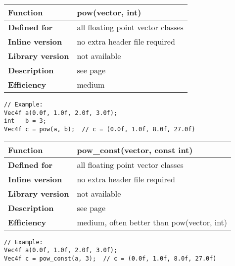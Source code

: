 \documentclass[vcl_manual.tex]{subfiles}
\begin{document}
\begin{tabular}{|p{30mm}|p{120mm}|}
\hline
\bfseries Function & pow(vector, int) \\ \hline
\bfseries Defined for & all floating point vector classes \\ \hline
\bfseries Inline version & no extra header file required \\ \hline
\bfseries Library version & not available \\ \hline
\bfseries Description & see page \pageref{powVectorInt} \\ \hline
\bfseries Efficiency & medium \\ \hline
\end{tabular}
\begin{lstlisting}[frame=none]
// Example:
Vec4f a(0.0f, 1.0f, 2.0f, 3.0f);
int   b = 3;
Vec4f c = pow(a, b);  // c = (0.0f, 1.0f, 8.0f, 27.0f)
\end{lstlisting}


\begin{tabular}{|p{30mm}|p{120mm}|}
\hline
\bfseries Function & pow\_const(vector, const int) \\ \hline
\bfseries Defined for & all floating point vector classes \\ \hline
\bfseries Inline version & no extra header file required \\ \hline
\bfseries Library version & not available \\ \hline
\bfseries Description & see page \pageref{powConstVectorInt} \\ \hline
\bfseries Efficiency & medium, often better than pow(vector, int) \\ \hline
\end{tabular}
\begin{lstlisting}[frame=none]
// Example:
Vec4f a(0.0f, 1.0f, 2.0f, 3.0f);
Vec4f c = pow_const(a, 3);  // c = (0.0f, 1.0f, 8.0f, 27.0f)
\end{lstlisting}
\end{document}
